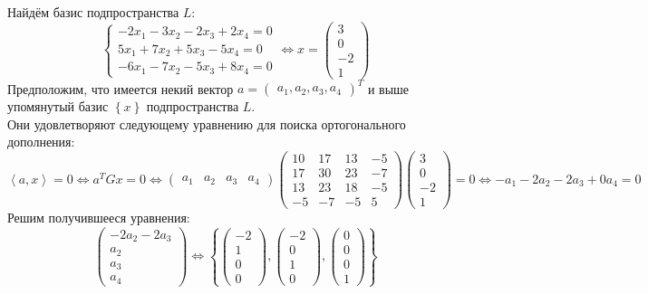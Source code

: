 \documentclass{article}
\begin{document}
\begin{center}
    Найдём базис подпространства $L$:
    $$\begin{cases}
            -2x_1 -3x_2 -2x_3 +2x_4 = 0   \\
            5x_1 + 7x_2 + 5x_3 - 5x_4 = 0 \\
            -6x_1 -7x_2 -5x_3 +8x_4 = 0
        \end{cases} \Leftrightarrow x = \begin{pmatrix}
            3 \\ 0 \\ -2 \\ 1
        \end{pmatrix}$$
    Предположим, что имеется некий вектор $a = \begin{pmatrix}
            a_1, a_2, a_3, a_4
        \end{pmatrix}^T$ и выше упомянутый базис $\left\{x\right\}$ подпространства $L$. \\
    Они удовлетворяют следующему уравнению для поиска ортогонального дополнения:
    $$\left\langle a, x\right\rangle = 0 \Leftrightarrow a^TGx = 0  \Leftrightarrow
        \begin{pmatrix}
            a_1 & a_2 & a_3 & a_4
        \end{pmatrix}\begin{pmatrix}
            10 & 17 & 13 & -5 \\
            17 & 30 & 23 & -7 \\
            13 & 23 & 18 & -5 \\
            -5 & -7 & -5 & 5
        \end{pmatrix}\begin{pmatrix}
            3 \\ 0 \\ -2 \\ 1
        \end{pmatrix} = 0
        \Leftrightarrow
        -a_1-2a_2-2a_3+0a_4 = 0$$
    Решим получившееся уравнения:
    $$\begin{pmatrix}
        -2a_2-2a_3 \\ a_2 \\ a_3 \\ a_4
    \end{pmatrix} \Leftrightarrow \left\{\begin{pmatrix}
        -2 \\ 1 \\ 0 \\ 0
    \end{pmatrix}, \begin{pmatrix}
        -2 \\ 0 \\ 1 \\ 0
    \end{pmatrix}, \begin{pmatrix}
        0 \\ 0 \\ 0 \\ 1
    \end{pmatrix}\right\} $$
\end{center}
\end{document}
